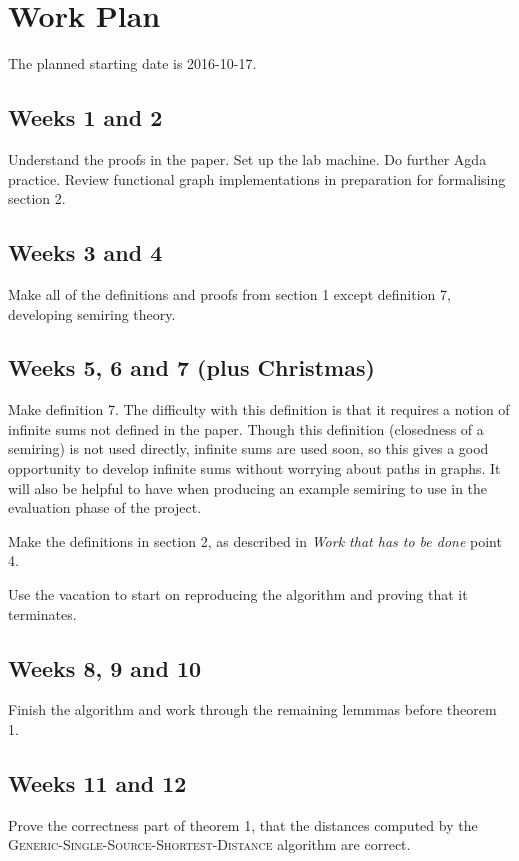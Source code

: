 \section*{Work Plan}
The planned starting date is 2016-10-17.

\subsection*{Weeks 1 and 2} %
Understand the proofs in the paper. Set up the lab machine. Do further Agda practice. Review functional graph implementations in preparation for formalising section 2.

\subsection*{Weeks 3 and 4} %
Make all of the definitions and proofs from section 1 except definition 7, developing semiring theory.

\subsection*{Weeks 5, 6 and 7 (plus Christmas)} %
Make definition 7.
The difficulty with this definition is that it requires a notion of infinite sums not defined in the paper.
Though this definition (closedness of a semiring) is not used directly, infinite sums are used soon, so this gives a good opportunity to develop infinite sums without worrying about paths in graphs.
It will also be helpful to have when producing an example semiring to use in the evaluation phase of the project.

Make the definitions in section 2, as described in \emph{Work that has to be done} point 4.

Use the vacation to start on reproducing the algorithm and proving that it terminates.

\subsection*{Weeks 8, 9 and 10} %
Finish the algorithm and work through the remaining lemmmas before theorem 1.

\subsection*{Weeks 11 and 12} %
Prove the correctness part of theorem 1, that the distances computed by the \textsc{Generic-Single-Source-Shortest-Distance} algorithm are correct.


